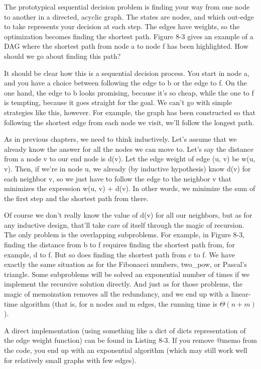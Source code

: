 The prototypical sequential decision problem is finding your way from one node to another in a
directed, acyclic graph. The states are nodes, and which out-edge to take represents your decision at each step. The edges have weights, so the optimization becomes finding the shortest path. Figure 8-3 gives an example of a DAG where the shortest path from node a to node f has been highlighted. How should we go about finding this path?

It should be clear how this is a sequential decision process. You start in node a, and you have a
choice between following the edge to b or the edge to f. On the one hand, the edge to b looks promising, because it's so cheap, while the one to f is tempting, because it goes straight for the goal. We can't go with simple strategies like this, however. For example, the graph has been constructed so that following the shortest edge from each node we visit, we'll follow the longest path. 

As in previous chapters, we need to think inductively. Let's assume that we already know the answer for all the nodes we can move to. Let's say the distance from a node v to our end node is d(v). Let the edge weight of edge (u, v) be w(u, v). Then, if we're in node u, we already (by inductive hypothesis) know d(v) for each neighbor v, so we just have to follow the edge to the neighbor v that minimizes the expression w(u, v) + d(v). In other words, we minimize the sum of the first step and the shortest path from there.

Of course we don't really know the value of d(v) for all our neighbors, but as for any inductive
design, that'll take care of itself through the magic of recursion. The only problem is the overlapping subproblems. For example, in Figure 8-3, finding the distance from b to f requires finding the shortest path from, for example, d to f. But so does finding the shortest path from c to f. We have exactly the same situation as for the Fibonacci numbers, two\_pow, or Pascal's triangle. Some subproblems will be solved an exponential number of times if we implement the recursive solution directly. And just as for those problems, the magic of memoization removes all the redundancy, and we end up with a linear-time algorithm (that is, for n nodes and m edges, the running time is $\Theta(n + m)$).

A direct implementation (using something like a dict of dicts representation of the edge weight
function) can be found in Listing 8-3. If you remove @memo from the code, you end up with an
exponential algorithm (which may still work well for relatively small graphs with few edges).


